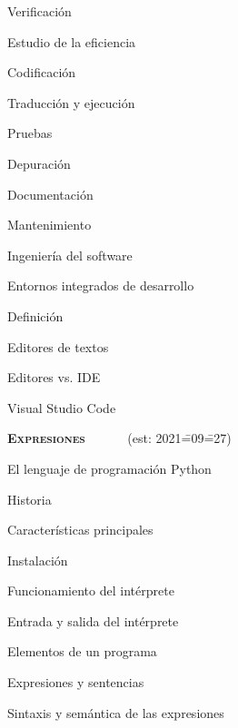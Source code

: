 \begin{longenum}
\begin{longenum}
\begin{longenum}
            \item Verificación
            \item Estudio de la eficiencia
            \item Codificación
            \item Traducción y ejecución
            \item Pruebas
            \item Depuración
            \item Documentación
            \item Mantenimiento
            \item Ingeniería del software
        \end{longenum}
        \item Entornos integrados de desarrollo
        \begin{longenum}
            \item Definición
            \item Editores de textos
            \item Editores vs. IDE
            \item Visual Studio Code
        \end{longenum}
    \end{longenum}
    \item \textbf{\textsc{Expresiones}} \ \ \ \ \ \ (est: 2021\==09\==27)
    \begin{longenum}
        \item El lenguaje de programación Python
        \begin{longenum}
            \item Historia
            \item Características principales
            \item Instalación
            \item Funcionamiento del intérprete
            \begin{longenum}
                \item Entrada y salida del intérprete
            \end{longenum}
        \end{longenum}
        \item Elementos de un programa
        \begin{longenum}
            \item Expresiones y sentencias
            \item Sintaxis y semántica de las expresiones
        \end{longenum}

\end{longenum}
\end{longenum}
